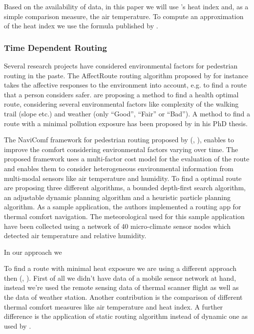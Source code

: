 Based on the availability of data, in this paper we will use \citeauthor{Steadman1979}'s heat index \parencite{Steadman1979} and, as a simple comparison measure, the air temperature. To compute an approximation of the heat index we use the formula published by \textcite[77]{Stull2011}.  

\subsubsection{Time Dependent Routing}
Several research projects have considered environmental factors for pedestrian routing in the paste. The AffectRoute routing algorithm proposed by \textcite{Huang2014} for instance takes the affective responses to the environment into account, e.g. to find a route that a person considers safer.  \textcite{Sharker2012} are proposing a method to find a health optimal route, considering several environmental factors like complexity of the walking trail (slope etc.) and weather (only “Good”, “Fair” or “Bad”). A method to find a route with a minimal pollution exposure has been proposed by \textcite{Hasenfratz2015} in his PhD thesis.

The NaviComf framework for pedestrian routing proposed by \citeauthor{Dang2012} (\citeyear{Dang2012}, \citeyear{Dang2013}), enables to improve the comfort considering environmental factors varying over time. The proposed framework uses a multi-factor cost model for the evaluation of the route and enables them to consider heterogeneous environmental information from multi-modal
 sensors like air temperature and humidity. To find a optimal route \textcite{Dang2013} are proposing three different algorithms,  a bounded depth-first search algorithm, an adjustable dynamic planning algorithm and a heuristic particle planning algorithm. As a sample application, the authors implemented a routing app for thermal comfort navigation. The meteorological used for this sample application have been collected using a network of 40 micro-climate sensor nodes which detected air temperature and relative humidity. 

In our approach we 

To find a route with minimal heat exposure we are using a different approach then \citeauthor{Dang2012} (\citeyear{Dang2012}, \citeyear{Dang2013}). First of all we didn't have data of a mobile sensor network at hand, instead we're used the remote sensing data of thermal scanner flight as well as the data of weather station. Another contribution is the comparison of different thermal comfort measures like air temperature and heat index. A further difference is the application of static routing algorithm instead of dynamic one as used by \citeauthor{Dang2012}.
